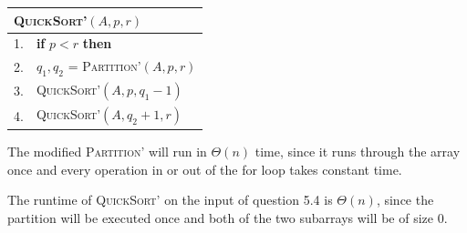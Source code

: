 \documentclass[a4paper,12pt]{article}
\begin{document}
\begin{minipage}{0.5\textwidth}
	\begin{center}
		\begin{tabular}{ll}
			\toprule
			\multicolumn{2}{l}{\textsc{QuickSort'}$(A,p,r)$}\\
			\midrule
			1. & \textbf{if} $p<r$ \textbf{then}\\
			2. & \qquad $q_1, q_2$ = \textsc{Partition'}$(A,p,r)$\\
			3. & \qquad \textsc{QuickSort'}$(A,p,q_1-1)$\\
			4. & \qquad \textsc{QuickSort'}$(A,q_2+1,r)$\\
			\bottomrule
		\end{tabular}
	\end{center}
\end{minipage}

The modified \textsc{Partition'} will run in $\Theta(n)$ time, since it runs through the array once and every operation in or out of the for loop takes constant time.

The runtime of \textsc{QuickSort'} on the input of question 5.4 is $\Theta(n)$, since the partition will be executed once and both of the two subarrays will be of size $0$.
\end{document}

